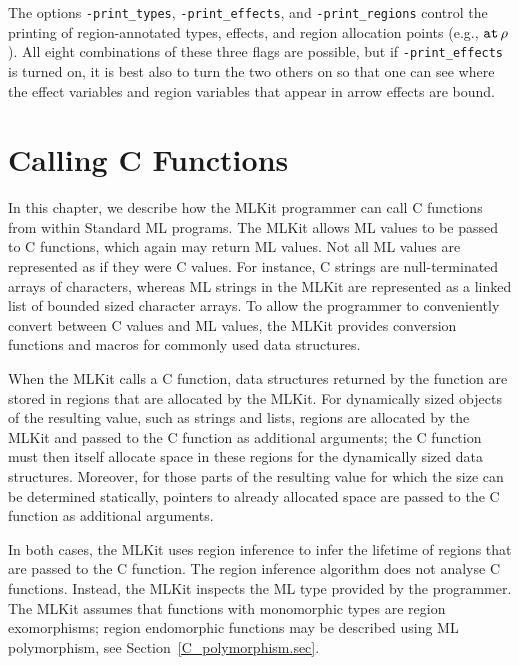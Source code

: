\documentclass[12pt]{book}
\begin{document}
The options
%
\texttt{-print\_types},
%
\texttt{-print\_effects}, and
%
\texttt{-print\_regions} control the printing of region-annotated types,
effects, and region allocation points (e.g., $\mathbin{\hbox{\tt at}}\,\rho$).
All eight combinations of these three flags are possible, but if
%
{\tt -print\_effects} is turned on, it is best also to turn the two
others on so that one can see where the effect variables and region variables
that appear in arrow effects are bound.

\chapter{Calling C Functions}
\label{ccall.sec}

In this chapter, we describe how the MLKit programmer can call 
%
C functions from within Standard ML programs.  The MLKit allows ML
values to be passed to C functions, which again may return ML values.
Not all ML values are represented as if they were C values. For
instance, C strings are null-terminated arrays of characters, whereas
ML strings in the MLKit are represented as a linked list of bounded
sized character arrays. To allow the programmer to conveniently
convert between C values and ML values, the MLKit provides conversion
functions and macros for commonly used data structures.

When the MLKit calls a C function, data structures returned by the
function are stored in regions that are allocated by the MLKit. For
dynamically sized objects of the resulting value, such as strings and
lists, regions are allocated by the MLKit and passed to the C function
as additional arguments; the C function must then itself allocate
space in these regions for the dynamically sized data
structures. Moreover, for those parts of the resulting value for which
the size can be determined statically, pointers to already allocated
space are passed to the C function as additional arguments.

In both cases, the MLKit uses region inference to infer the lifetime of
regions that are passed to the C function.  The region inference
algorithm does not analyse C functions. Instead, the MLKit inspects the
ML type provided by the programmer. The MLKit assumes that functions
with monomorphic types are 
%
region exomorphisms;
%
region endomorphic functions may be described using ML polymorphism,
see Section~\ref{C_polymorphism.sec}.
\end{document}
